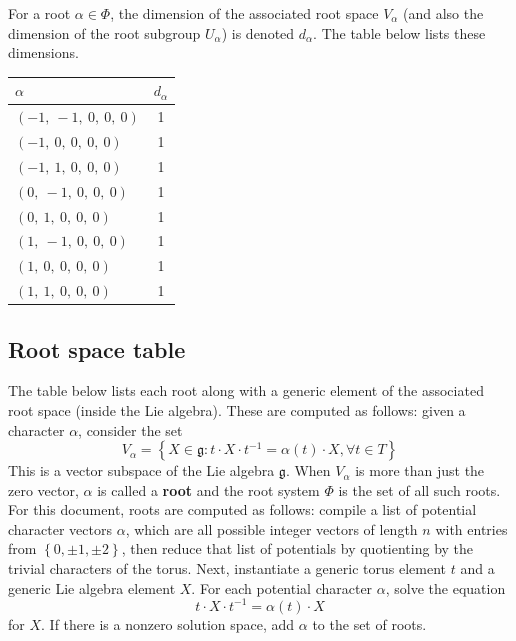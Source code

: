 \documentclass[11pt]{article}
\newcommand{\noi}{\noindent}
\newcommand{\tbf}{\textbf}
\newcommand{\inv}{^{-1}}
\newcommand{\lb}{\left\{}
\newcommand{\rb}{\right\}}
\newcommand{\frakg}{\mathfrak{g}}
\theoremstyle{definition}
\begin{document}
For a root $\alpha \in \Phi$, the dimension of the associated root space $V_\alpha$ (and also the dimension of the root subgroup $U_\alpha$) is denoted $d_\alpha$. The table below lists these dimensions.

\bigskip

\noindent \begin{tabular}{|l|c|}
    \hline
    \textbf{$\alpha$} & \textbf{$d_{\alpha}$} \\
    \hline
    $\left( -1, \  -1, \  0, \  0, \  0\right)$ & 1 \\
    \hline
    $\left( -1, \  0, \  0, \  0, \  0\right)$ & 1 \\
    \hline
    $\left( -1, \  1, \  0, \  0, \  0\right)$ & 1 \\
    \hline
    $\left( 0, \  -1, \  0, \  0, \  0\right)$ & 1 \\
    \hline
    $\left( 0, \  1, \  0, \  0, \  0\right)$ & 1 \\
    \hline
    $\left( 1, \  -1, \  0, \  0, \  0\right)$ & 1 \\
    \hline
    $\left( 1, \  0, \  0, \  0, \  0\right)$ & 1 \\
    \hline
    $\left( 1, \  1, \  0, \  0, \  0\right)$ & 1 \\
    \hline
\end{tabular}


\subsection{Root space table}

\noi The table below lists each root along with a generic element of the associated root space (inside the Lie algebra). These are computed as follows: given a character $\alpha$, consider the set
\[
	V_\alpha = \lb X \in \frakg : t \cdot X \cdot t \inv = \alpha(t) \cdot X, \forall t \in T \rb
\]
This is a vector subspace of the Lie algebra $\frakg$. When $V_\alpha$ is more than just the zero vector, $\alpha$ is called a \tbf{root} and the root system $\Phi$ is the set of all such roots. For this document, roots are computed as follows: compile a list of potential character vectors $\alpha$, which are all possible integer vectors of length $n$ with entries from $\lb 0, \pm 1, \pm 2 \rb$, then reduce that list of potentials by quotienting by the trivial characters of the torus. Next, instantiate a generic torus element $t$ and a generic Lie algebra element $X$. For each potential character $\alpha$, solve the equation
\[
	t \cdot X \cdot t \inv = \alpha(t) \cdot X
\]
for $X$. If there is a nonzero solution space, add $\alpha$ to the set of roots.
\end{document}
